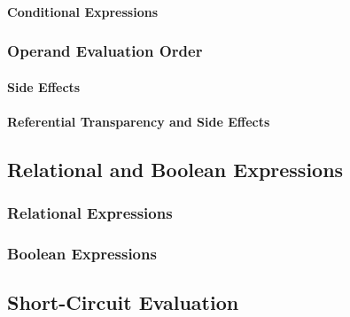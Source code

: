 \paragraph{Conditional Expressions}\label{par:Operator_Evaluation_Order-Conditional_Expressions}

\subsubsection{Operand Evaluation Order}\label{subsubsec:Operand_Evaluation_Order}
\paragraph{Side Effects}\label{par:Operand_Evaluation-Side_Effects}
\paragraph{Referential Transparency and Side Effects}\label{par:Operand_Evaluation-Referential_Transparency_Side_Effects}

\subsection{Relational and Boolean Expressions}\label{subsec:Relational_Boolean_Expressions}
\subsubsection{Relational Expressions}\label{subsubsec:Relational_Expressions}
\subsubsection{Boolean Expressions}\label{subsubsec:Boolean_Expressions}

\subsection{Short-Circuit Evaluation}\label{subsec:Short_Circuit_Evaluation}

